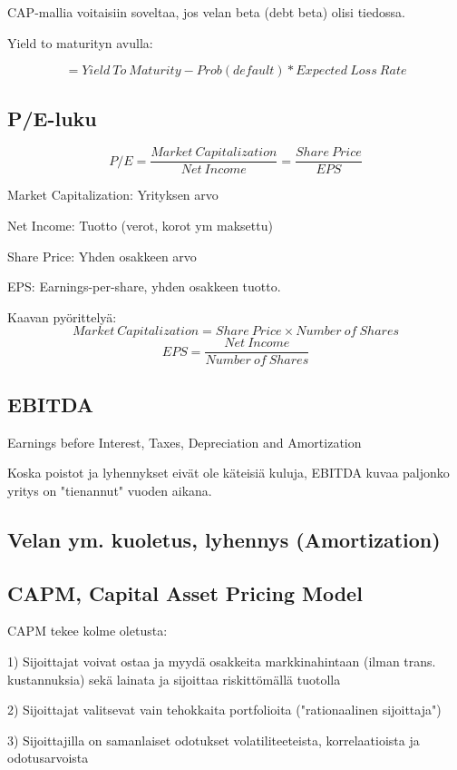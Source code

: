 \documentclass[a4paper]{article}
\begin{document}
CAP-mallia voitaisiin soveltaa, jos velan beta (debt beta) olisi tiedossa.

Yield to maturityn avulla:

\[
    = Yield\ To\ Maturity - Prob(default) * Expected\ Loss\ Rate
\]

\subsection{P/E-luku}

\[
    P/E = \frac{Market\ Capitalization}{Net\ Income} = \frac{Share\ Price}{EPS}
\]

Market Capitalization: Yrityksen arvo

Net Income: Tuotto (verot, korot ym maksettu)

Share Price: Yhden osakkeen arvo

EPS: Earnings-per-share, yhden osakkeen tuotto.

Kaavan pyörittelyä: 
\[
    Market\ Capitalization = Share\ Price \times Number\ of\ Shares
\]
\[
    EPS = \frac{Net\ Income}{Number\ of\ Shares} 
\]

\subsection{EBITDA}

Earnings before Interest, Taxes, Depreciation and Amortization

Koska poistot ja lyhennykset eivät ole käteisiä kuluja, EBITDA kuvaa paljonko yritys on "tienannut" vuoden aikana.

\subsection{Velan ym. kuoletus, lyhennys (Amortization)}



\subsection{CAPM, Capital Asset Pricing Model}

CAPM tekee kolme oletusta:

1) Sijoittajat voivat ostaa ja myydä osakkeita markkinahintaan (ilman trans. kustannuksia) sekä lainata ja sijoittaa riskittömällä tuotolla

2) Sijoittajat valitsevat vain tehokkaita portfolioita ("rationaalinen sijoittaja")

3) Sijoittajilla on samanlaiset odotukset volatiliteeteista, korrelaatioista ja odotusarvoista
\end{document}
